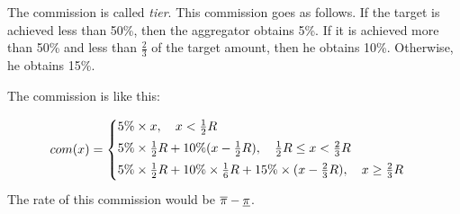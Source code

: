 \documentclass{article}
\begin{document}
The commission is called \emph{tier}. 
This commission goes as follows.
If the target is achieved less than 50\%, then the aggregator obtains 5\%.
If it is achieved more than 50\% and less than $\frac23$ of the target amount, then he obtains 10\%.
Otherwise, he obtains 15\%.

The commission is like this:

\begin{equation}
  com(x) = 
  \begin{cases}
    5\% \times x , \quad x < \frac12 \target \vspace{0.1cm}\\
    5\% \times \frac12 \target + 10\% (x- \frac12 \target), \quad \frac12 \target \le x < \frac23 \target \vspace{0.1cm} \\
    5\% \times \frac12 \target + 10\% \times \frac16 \target + 15 \% \times (x - \frac23 \target), \quad x \ge \frac23 \target \vspace{0.1cm}
  \end{cases}
\end{equation}
The rate of this commission would be $\overline{\pi} - \underline{\pi}$.








\end{document}
